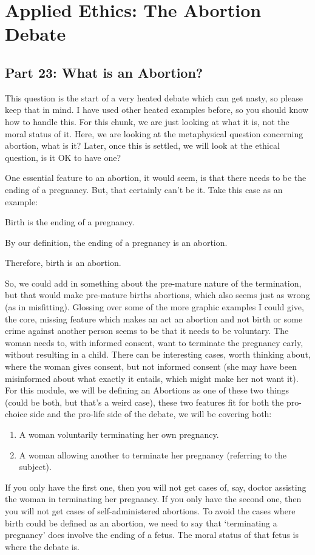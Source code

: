 \part{Applied Ethics: The Abortion Debate}
\label{ch.mod8}

\chapter{Part 23: What is an Abortion?}

This question is the start of a very heated debate which can get nasty, so please keep that in mind. I have used other heated examples before, so you should know how to handle this. For this chunk, we are just looking at what it is, not the moral status of it. Here, we are looking at the metaphysical question concerning abortion, what is it? Later, once this is settled, we will look at the ethical question, is it OK to have one? 

One essential feature to an abortion, it would seem, is that there needs to be the ending of a pregnancy. But, that certainly can't be it. Take this case as an example:
\begin{earg}
    \item[] Birth is the ending of a pregnancy. 
    \item[] By our definition, the ending of a pregnancy is an abortion. 
    \item[Therefore,] birth is an abortion.
\end{earg}
So, we could add in something about the pre-mature nature of the termination, but that would make pre-mature births abortions, which also seems just as wrong (as in misfitting). Glossing over some of the more graphic examples I could give, the core, missing feature which makes an act an abortion and not birth or some crime against another person seems to be that it needs to be voluntary. The woman needs to, with informed consent, want to terminate the pregnancy early, without resulting in a child. There can be interesting cases, worth thinking about, where the woman gives consent, but not informed consent (she may have been misinformed about what exactly it entails, which might make her not want it).   For this module, we will be defining an \glspl{Abortion} as one of these two things (could be both, but that's a weird case), these two features fit for both the pro-choice side and the pro-life side of the debate, we will be covering both:
\begin{enumerate}
\item A woman voluntarily terminating her own pregnancy.  	
\item A woman allowing another to terminate her pregnancy (referring to the subject).
\end{enumerate}
If you only have the first one, then you will not get cases of, say, doctor assisting the woman in terminating her pregnancy. If you only have the second one, then you will not get cases of self-administered abortions.  To avoid the cases where birth could be defined as an abortion, we need to say that `terminating a pregnancy' does involve the ending of a fetus. The moral status of that fetus is where the debate is.  

